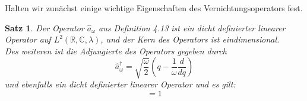 \documentclass[11pt,a4paper,leqno]{report}
\newtheorem{proposition}{Satz}[chapter]
\numberwithin{equation}{chapter}
\begin{document}
\noindent
Halten wir zun\"achst einige wichtige Eigenschaften des 
Vernichtungsoperators fest.
\begin{proposition}
	Der Operator $\hat{a}_\omega$ aus Definition 4.13 ist ein dicht definierter linearer Operator auf $L^2(\mathbb{R}, \mathbb{C},\lambda)$, und der Kern des Operators ist eindimensional.\\
	Des weiteren ist die Adjungierte des Operators gegeben durch 
	\begin{equation}
		\hat{a}_\omega^\dagger = \sqrt{\frac{\omega}{2}}(q - \frac{1}{\omega}\frac{d}{dq})
	\end{equation}
	und ebenfalls ein dicht definierter linearer Operator und es gilt:
	\begin{equation}
		[\hat{a}_\omega, \hat{a}_\omega^\dagger] = 1
	\end{equation}
\end{proposition}
\end{document}
